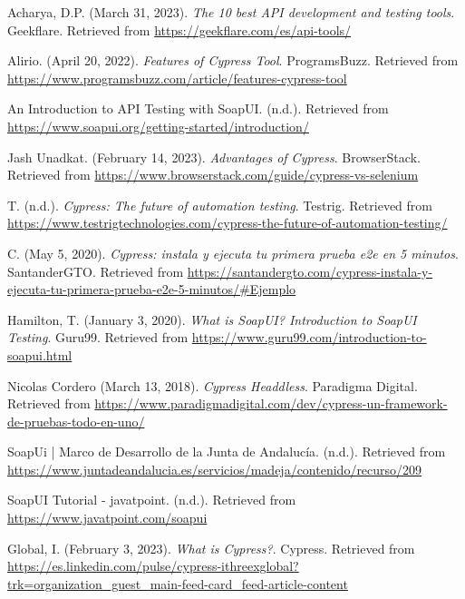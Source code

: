 \documentclass{article}
\begin{document}
	
	\begin{thebibliography}{9}
			Acharya, D.P. (March 31, 2023). \textit{The 10 best API development and testing tools}. Geekflare. Retrieved from \url{https://geekflare.com/es/api-tools/}
			
			Alirio. (April 20, 2022). \textit{Features of Cypress Tool}. ProgramsBuzz. Retrieved from \url{https://www.programsbuzz.com/article/features-cypress-tool}
			
			An Introduction to API Testing with SoapUI. (n.d.). Retrieved from \url{https://www.soapui.org/getting-started/introduction/}
			
			Jash Unadkat. (February 14, 2023). \textit{Advantages of Cypress}. BrowserStack. Retrieved from \url{https://www.browserstack.com/guide/cypress-vs-selenium}
			
			T. (n.d.). \textit{Cypress: The future of automation testing}. Testrig. Retrieved from \url{https://www.testrigtechnologies.com/cypress-the-future-of-automation-testing/}
			
			C. (May 5, 2020). \textit{Cypress: instala y ejecuta tu primera prueba e2e en 5 minutos}. SantanderGTO. Retrieved from \url{https://santandergto.com/cypress-instala-y-ejecuta-tu-primera-prueba-e2e-5-minutos/#Ejemplo}
			
			Hamilton, T. (January 3, 2020). \textit{What is SoapUI? Introduction to SoapUI Testing}. Guru99. Retrieved from \url{https://www.guru99.com/introduction-to-soapui.html}
			
			Nicolas Cordero (March 13, 2018). \textit{Cypress Headdless}. Paradigma Digital. Retrieved from \url{https://www.paradigmadigital.com/dev/cypress-un-framework-de-pruebas-todo-en-uno/}
			
			SoapUi | Marco de Desarrollo de la Junta de Andalucía. (n.d.). Retrieved from \url{https://www.juntadeandalucia.es/servicios/madeja/contenido/recurso/209}
			
			SoapUI Tutorial - javatpoint. (n.d.). Retrieved from \url{https://www.javatpoint.com/soapui}
			
		
			Global, I. (February 3, 2023). \textit{What is Cypress?}. Cypress. Retrieved from \url{https://es.linkedin.com/pulse/cypress-ithreexglobal?trk=organization_guest_main-feed-card_feed-article-content}
			
	\end{thebibliography}
	
\end{document}
